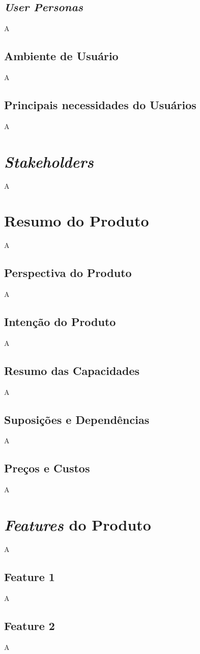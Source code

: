 \begin{apendicesenv}
		\subsection{\textit{User Personas}}
A
		\subsection{Ambiente de Usuário}
A
		\subsection{Principais necessidades do Usuários}
A
	
	\section{\textit{Stakeholders}}
A
		
	\section{Resumo do Produto}
A
		\subsection{Perspectiva do Produto}
A
		\subsection{Intenção do Produto}
A
		\subsection{Resumo das Capacidades}
A
		\subsection{Suposições e Dependências}
A
		\subsection{Preços e Custos}
A
	\section{\textit{Features} do Produto}
A
		\subsection{Feature 1}
A
		\subsection{Feature 2}
A

\end{apendicesenv}
